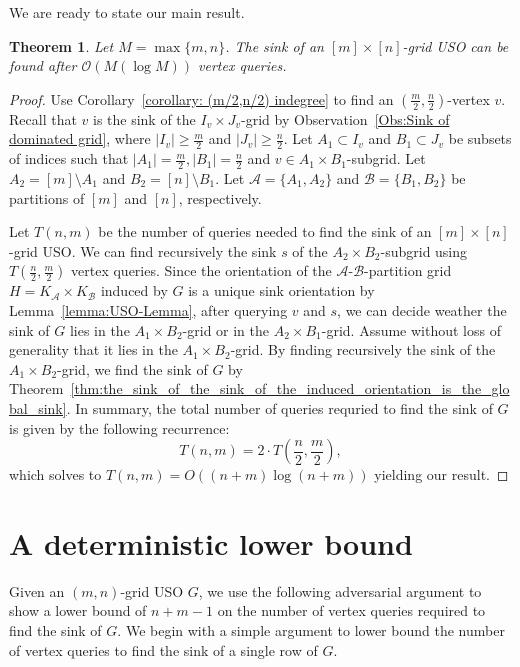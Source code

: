 \documentclass[a4paper,10pt]{article}
\newtheorem{theorem}{Theorem}
\newcommand{\A}{\ensuremath{\mathcal A}}
\newcommand{\B}{\ensuremath{\mathcal B}}
\begin{document}
We are ready to state our main result. 
\begin{theorem}\label{theorem:Sink algorithm}
 Let $M = \max\{m,n\}$. The sink of an $[m]\times[n]$-grid USO can be found after $\mathcal{O}(M(\log M))$ vertex queries.
\end{theorem}
\begin{proof}
Use Corollary~\ref{corollary: (m/2,n/2) indegree} to find an $(\frac{m}{2}, \frac{n}{2})$-vertex $v$. 
Recall that $v$ is the sink of the $I_v\times J_v$-grid by Observation~\ref{Obs:Sink of dominated grid}, where $|I_v| \geq \frac{m}{2}$ and $|J_v|\geq \frac{n}{2}$. Let $A_1\subset I_v$ and $B_1\subset J_v$ be subsets of indices such that $|A_1| = \frac{m}{2}, |B_1| = \frac{n}{2}$ and $v\in A_1\times B_1$-subgrid.
Let $A_2= [m]\setminus A_1$ and $B_2 = [n]\setminus B_1$.
Let $\A = \{A_1, A_2\}$ and $\B = \{B_1, B_2\}$ be partitions of $[m]$ and $[n]$, respectively.

Let $T(n, m)$ be the number of queries needed to find the sink of an $[m]\times[n]$-grid USO.
We can find recursively the sink $s$ of the $A_2\times B_2$-subgrid using $T(\frac{n}{2}, \frac{m}{2})$ vertex queries. 
Since the orientation of the $\A$-$\B$-partition grid $H = K_\A \times K_\B$ induced by $G$ is a unique sink orientation by Lemma~\ref{lemma:USO-Lemma}, after querying $v$ and $s$, we can decide weather the sink of $G$ lies in the $A_1\times B_2$-grid or in the $A_2\times B_1$-grid. Assume without loss of generality that it lies in the $A_1\times B_2$-grid.
By finding recursively the sink of the $A_1\times B_2$-grid, we find the sink of $G$ by Theorem~\ref{thm:the_sink_of_the_sink_of_the_induced_orientation_is_the_global_sink}. In summary, the total number of queries requried to find the sink of $G$ is given by the following recurrence:
$$T(n, m) = 2\cdot T\left(\frac{n}{2}, \frac{m}{2}\right),$$
which solves to $T(n, m) = O((n+m) \log (n+m))$ yielding our result.
\end{proof}
 
\section{A deterministic lower bound}

Given an $(m, n)$-grid USO $G$, we use the following adversarial argument to show a lower bound of $n + m -1$ on the number of vertex queries required to find the sink of $G$.
We begin with a simple argument to lower bound the number of vertex queries to find the sink of a single row of $G$.
\end{document}
